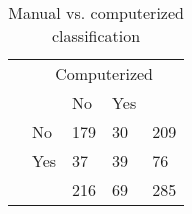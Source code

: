 \begin{table}
\begin{small}
\begin{threeparttable}
\caption{{\normalsize Manual vs. computerized classification}}
\begin{tabular}{ll|ll|l}
& \multicolumn{4}{c}{Computerized} \tabularnewline[0.1cm]
& & No & Yes &   \tabularnewline
\cline{2-5}
\parbox[t]{2mm}{} & No & 179 & 30 & 209 \tabularnewline
& Yes & 37 & 39 & 76 \tabularnewline
{}
&  & 216 & 69 & 285 \tabularnewline
\end{tabular}
\end{threeparttable}
\end{small}
\end{table}
